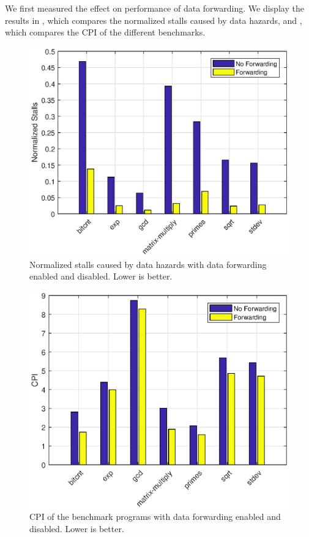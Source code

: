 \documentclass[conference, hidelinks]{IEEEtran}
\begin{document}
We first measured the effect on performance of data forwarding. We display the results in , which compares the normalized stalls caused by data hazards, and , which compares the CPI of the different benchmarks.

\begin{figure}[!htb]
  \centering
  \includegraphics[width=0.775\columnwidth]{plots/forwarding_stalls.eps}
  \caption{Normalized stalls caused by data hazards with data forwarding enabled and disabled. Lower is better.}
  \label{fig:fwd_stalls}
\end{figure}

\begin{figure}[!htb]
  \centering
  \includegraphics[width=0.775\columnwidth]{plots/forwarding_cpi.eps}
  \caption{CPI of the benchmark programs with data forwarding enabled and disabled. Lower is better.}
  \label{fig:fwd_cpi}
\end{figure}
\end{document}
